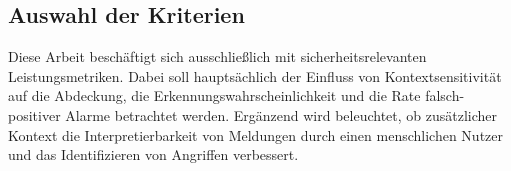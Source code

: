 \subsection{Auswahl der Kriterien}
Diese Arbeit beschäftigt sich ausschließlich mit sicherheitsrelevanten Leistungsmetriken. Dabei soll hauptsächlich der Einfluss von Kontextsensitivität auf die Abdeckung, die Erkennungswahrscheinlichkeit und die Rate falsch-positiver Alarme betrachtet werden. Ergänzend wird beleuchtet, ob zusätzlicher Kontext die Interpretierbarkeit von Meldungen durch einen menschlichen Nutzer und das Identifizieren von Angriffen verbessert.
